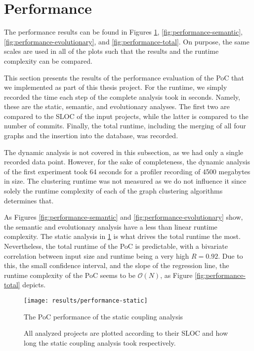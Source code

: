 \documentclass[12pt,a4paper]{report}
\begin{document}
\section{Performance}

The performance results can be found in Figures \ref{fig:performance-static},
\ref{fig:performance-semantic}, \ref{fig:performance-evolutionary}, and
\ref{fig:performance-total}. On purpose, the same scales are used in all of the
plots such that the results and the runtime complexity can be compared.

This section presents the results of the performance evaluation of the PoC that
we implemented as part of this thesis project. For the runtime, we simply
recorded the time each step of the complete analysis took in seconds. Namely,
these are the static, semantic, and evolutionary analyses. The first two are
compared to the SLOC of the input projects, while the latter is compared to the
number of commits. Finally, the total runtime, including the merging of all
four graphs and the insertion into the database, was recorded.

The dynamic analysis is not covered in this subsection, as we had only a single
recorded data point. However, for the sake of completeness, the dynamic
analysis of the first experiment took 64 seconds for a profiler recording of
4500 megabytes in size. The clustering runtime was not measured as we do not
influence it since solely the runtime complexity of each of the graph
clustering algorithms determines that.

As Figures \ref{fig:performance-semantic} and \ref{fig:performance-evolutionary}
show, the semantic and evolutionary analysis have a less than
linear runtime complexity. The static analysis in \ref{fig:performance-static}
is what drives the total runtime the most. Nevertheless, the total runtime of
the PoC is predictable, with a bivariate correlation between input size and
runtime being a very high \(R = 0.92\). Due to this, the small confidence
interval, and the slope of the regression line, the runtime complexity of the
PoC seems to be \(\mathcal{O}(N)\), as Figure \ref{fig:performance-total}
depicts.

\begin{figure}[htbp]
\centering
\texttt{[image: results/performance-static]}
\caption{The PoC performance of the static coupling analysis}
\caption*{\centering
  All analyzed projects are plotted according to their SLOC
  and how long the static coupling analysis took respectively.
}
\label{fig:performance-static}
\end{figure}
\end{document}
